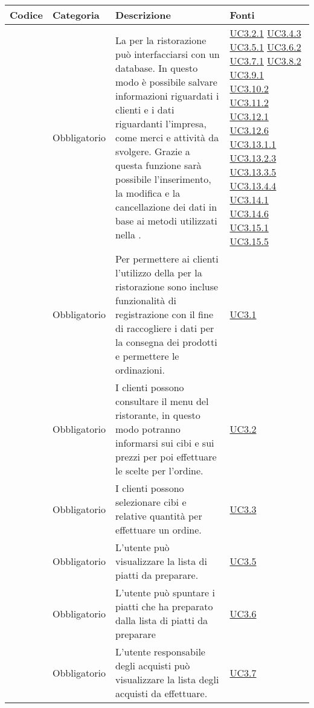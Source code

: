 \begin{longtable}{|P{1.5cm}|P{2.5cm}|P{6.5cm}|P{2.5cm}|}
	\hline \textbf{Codice} & \textbf{Categoria} & \textbf{Descrizione} & \textbf{Fonti} \\
	\hline \RequisitoObF\label{L21} & Obbligatorio & La  per la ristorazione può interfacciarsi con un database. In questo modo è possibile salvare informazioni riguardati i clienti e i dati riguardanti l'impresa, come merci e attività da svolgere. Grazie a questa funzione sarà possibile l'inserimento, la modifica e la cancellazione dei dati in base ai metodi utilizzati nella . & \hyperref[UC3.2.1]{UC3.2.1} \hyperref[UC3.4.3]{UC3.4.3} \hyperref[UC3.5.1]{UC3.5.1} \hyperref[UC3.6.2]{UC3.6.2} \hyperref[UC3.7.1]{UC3.7.1} \hyperref[UC3.8.2]{UC3.8.2} \hyperref[UC3.9.1]{UC3.9.1} \hyperref[UC3.10.2]{UC3.10.2} \hyperref[UC3.11.2]{UC3.11.2} \hyperref[UC3.12.1]{UC3.12.1} \hyperref[UC3.12.6]{UC3.12.6} \hyperref[UC3.13.1.1]{UC3.13.1.1} \hyperref[UC3.13.2.3]{UC3.13.2.3} \hyperref[UC3.13.3.5]{UC3.13.3.5} \hyperref[UC3.13.4.4]{UC3.13.4.4} \hyperref[UC3.14.1]{UC3.14.1} \hyperref[UC3.14.6]{UC3.14.6} \hyperref[UC3.15.1]{UC3.15.1} \hyperref[UC3.15.5]{UC3.15.5} \\
	\hline \RequisitoObF\label{L22} & Obbligatorio & Per permettere ai clienti l'utilizzo della  per la ristorazione sono incluse funzionalità di registrazione con il fine di raccogliere i dati per la consegna dei prodotti e permettere le ordinazioni. & \hyperref[UC3.1]{UC3.1} \\
	\hline \RequisitoObF\label{L23} & Obbligatorio & I clienti possono consultare il menu del ristorante, in questo modo potranno informarsi sui cibi e sui prezzi per poi effettuare le scelte per l'ordine. & \hyperref[UC3.2]{UC3.2} \\
	\hline \RequisitoObF\label{L24} & Obbligatorio & I clienti possono selezionare cibi e relative quantità per effettuare un ordine. & \hyperref[UC3.3]{UC3.3} \\
	\hline \RequisitoObF\label{L25} & Obbligatorio & L'utente  può visualizzare la lista di piatti da preparare. & \hyperref[UC3.5]{UC3.5} \\
	\hline \RequisitoObF\label{L26} & Obbligatorio & L'utente  può spuntare i piatti che ha preparato dalla lista di piatti da preparare  & \hyperref[UC3.6]{UC3.6} \\
	\hline \RequisitoObF\label{L27} & Obbligatorio & L'utente responsabile degli acquisti può visualizzare la lista degli acquisti da effettuare. & \hyperref[UC3.7]{UC3.7} \\

\end{longtable}

